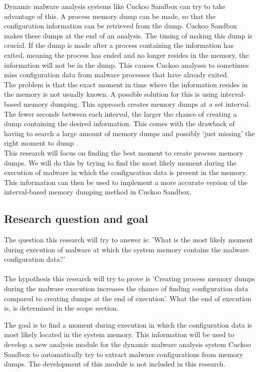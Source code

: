 \documentclass[conference]{IEEEtran}
\begin{document}
Dynamic malware analysis systems like Cuckoo Sandbox \cite{cuckoo} can try to take advantage of this. A process memory dump can be made, so that the configuration information can be retrieved from the dump. Cuckoo Sandbox makes these dumps at the end of an analysis. The timing of making this dump is crucial. If the dump is made after a process containing the information has exited, meaning the process has ended and no longer resides in the memory, the information will not be in the dump. This causes Cuckoo analyses to sometimes miss \Gls{configuration data} from malware processes that have already exited.\\

The problem is that the exact moment in time where the information resides in the memory is not usually known. A possible solution for this is using interval-based memory dumping. This approach creates memory dumps at a set interval. The fewer seconds between each interval, the larger the chance of creating a dump containing the desired information. This comes with the drawback of having to search a large amount of memory dumps and possibly ‘just missing’ the right moment to dump \cite{teller-memory}.\\

This research will focus on finding the best moment to create process memory dumps. We will do this by trying to find the most likely moment during the execution of malware in which the \Gls{configuration data} is present in the memory. This information can then be used to implement a more accurate version of the interval-based memory dumping method in Cuckoo Sandbox.\\


\subsection{Research question and goal}
The question this research will try to answer is: 'What is the most likely moment during execution of malware at which the system memory contains the malware \Gls{configuration data}?'\\
\\The hypothesis this research will try to prove is 'Creating process memory dumps during the malware execution increases the chance of finding \Gls{configuration data} compared to creating dumps at the end of execution'. What the end of execution is, is determined in the scope section.

The goal is to find a moment during execution in which the \Gls{configuration data} is most likely located in the system memory. This information will be used to develop a new analysis module for the dynamic malware analysis system Cuckoo Sandbox to automatically try to extract malware configurations from memory dumps. The development of this module is not included in this research.
\end{document}
